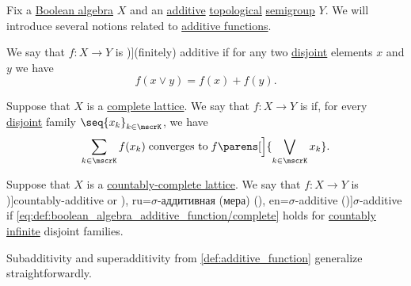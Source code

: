 \begin{definition}\label{def:boolean_algebra_additive_function}\mimprovised
  Fix a \hyperref[def:boolean_algebra]{Boolean algebra} \( X \) and an \hyperref[con:additive_semigroup]{additive} \hyperref[rem:topological_first_order_structures]{topological} \hyperref[def:semigroup]{semigroup} \( Y \). We will introduce several notions related to \hyperref[def:additive_function]{additive functions}.

  \begin{thmenum}
     We say that \( f: X \to Y \) is \term[ru=(конечно) аддитивная (функция), en=finitely additive (\cite[289]{HalmosGivant2009BooleanAlgebras})]{(finitely) additive} if for any two \hyperref[def:disjoint_lattice_elements]{disjoint} elements \( x \) and \( y \) we have
    \begin{equation}\label{eq:def:boolean_algebra_additive_function/finite}
      f(x \vee y) = f(x) + f(y).
    \end{equation}

     Suppose that \( X \) is a \hyperref[def:complete_lattice]{complete lattice}. We say that \( f: X \to Y \) is  if, for every \hyperref[def:disjoint_lattice_elements]{disjoint} family \( \seq{ x_k }_{k \in \mscrK} \), we have
    \begin{equation}\label{eq:def:boolean_algebra_additive_function/complete}
      \sum_{k \in \mscrK} f(x_k) \T{converges to} f\parens[\Big]{ \bigvee_{k \in \mscrK} x_k }.
    \end{equation}

     Suppose that \( X \) is a \hyperref[def:countably_complete_lattice]{countably-complete lattice}. We say that \( f: X \to Y \) is \term[ru=счётно аддитивная (функция), en=countably additive (\cite[289]{HalmosGivant2009BooleanAlgebras})]{countably-additive} or \term[bg=\( \sigma \)-адитивно (изображение) (\cite[def. 3.7]{Драганов2022ТеорияНаМярката}), ru=\( \sigma \)-аддитивная (мера) (\cite[def. 2.1]{ДьяченкоУльянов1998МераИИнтеграл}), en=\( \sigma \)-additive (\cite[289]{HalmosGivant2009BooleanAlgebras})]{\( \sigma \)-additive} if \eqref{eq:def:boolean_algebra_additive_function/complete} holds for \hyperref[def:set_countability/countably_infinite]{countably infinite} disjoint families.
  \end{thmenum}

  Subadditivity and superadditivity from \cref{def:additive_function} generalize straightforwardly.
\end{definition}
